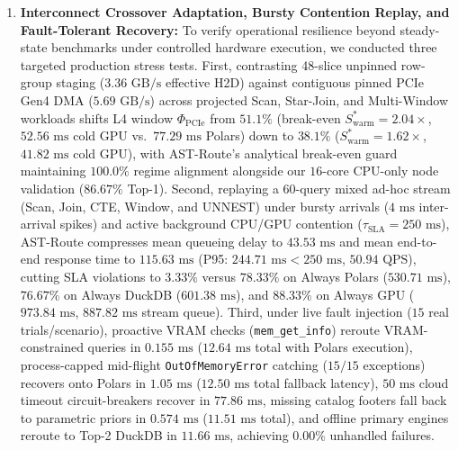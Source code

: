 \documentclass[10pt,a4paper]{article}
\begin{document}
\begin{enumerate}[leftmargin=1.5em,itemsep=0.8pt]
\item \textbf{Interconnect Crossover Adaptation, Bursty Contention Replay, and Fault-Tolerant Recovery:} To verify operational resilience beyond steady-state benchmarks under controlled hardware execution, we conducted three targeted production stress tests. First, contrasting 48-slice unpinned row-group staging ($3.36\text{ GB/s}$ effective H2D) against contiguous pinned PCIe Gen4 DMA ($5.69\text{ GB/s}$) across projected Scan, Star-Join, and Multi-Window workloads shifts L4 window $\Phi_{\text{PCIe}}$ from $51.1\%$ (break-even $S_{\text{warm}}^* = 2.04\times$, $52.56\text{ ms}$ cold GPU vs.\ $77.29\text{ ms}$ Polars) down to $38.1\%$ ($S_{\text{warm}}^* = 1.62\times$, $41.82\text{ ms}$ cold GPU), with AST-Route's analytical break-even guard maintaining $100.0\%$ regime alignment alongside our $16$-core CPU-only node validation ($86.67\%$ Top-1). Second, replaying a $60$-query mixed ad-hoc stream (Scan, Join, CTE, Window, and UNNEST) under bursty arrivals ($4\text{ ms}$ inter-arrival spikes) and active background CPU/GPU contention ($\tau_{\text{SLA}}=250\text{ ms}$), AST-Route compresses mean queueing delay to $43.53\text{ ms}$ and mean end-to-end response time to $115.63\text{ ms}$ (P95: $244.71\text{ ms} < 250\text{ ms}$, $50.94\text{ QPS}$), cutting SLA violations to $3.33\%$ versus $78.33\%$ on Always Polars ($530.71\text{ ms}$), $76.67\%$ on Always DuckDB ($601.38\text{ ms}$), and $88.33\%$ on Always GPU ($973.84\text{ ms}$, $887.82\text{ ms}$ stream queue). Third, under live fault injection ($15$ real trials/scenario), proactive VRAM checks (\texttt{mem\_\allowbreak{}get\_\allowbreak{}info}) reroute VRAM-constrained queries in $0.155\text{ ms}$ ($12.64\text{ ms}$ total with Polars execution), process-capped mid-flight \texttt{OutOfMemoryError} catching ($15/15$ exceptions) recovers onto Polars in $1.05\text{ ms}$ ($12.50\text{ ms}$ total fallback latency), $50\text{ ms}$ cloud timeout circuit-breakers recover in $77.86\text{ ms}$, missing catalog footers fall back to parametric priors in $0.574\text{ ms}$ ($11.51\text{ ms}$ total), and offline primary engines reroute to Top-2 DuckDB in $11.66\text{ ms}$, achieving $0.00\%$ unhandled failures.
\end{enumerate}
\end{document}
